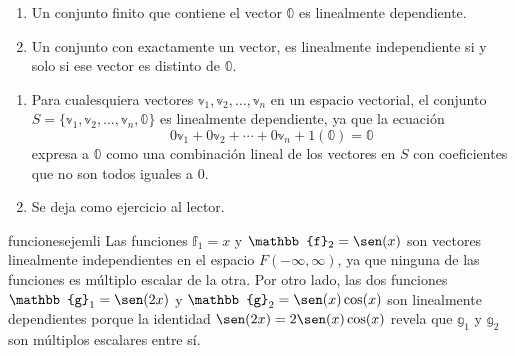 \begin{theorem}{}{}
    \begin{enumerate}[label=\roman*), topsep=6pt, itemsep=0pt]
        \item Un conjunto finito que contiene el vector $\mathbb{0}$ es linealmente dependiente.
        \item Un conjunto con exactamente un vector, es linealmente independiente si y solo si ese vector es distinto de $\mathbb{0}$.
    \end{enumerate}

    \tcblower
    \demostracion
    \begin{enumerate}[label=\roman*), topsep=6pt, itemsep=0pt]
        \item Para cualesquiera vectores $\mathbb{v}_1, \mathbb{v}_2, \dots, \mathbb{v}_n$ en un espacio vectorial, el conjunto $S = \{\mathbb{v}_1, \mathbb{v}_2, \dots, \mathbb{v}_n, \mathbb{0}\}$ es linealmente dependiente, ya que la ecuación
        $$0\mathbb{v}_1 + 0\mathbb{v}_2 + \cdots + 0\mathbb{v}_n + 1(\mathbb{0}) = \mathbb{0}$$
        expresa a $\mathbb{0}$ como una combinación lineal de los vectores en $S$ con coeficientes que no son todos iguales a $0$.
        \item Se deja como ejercicio al lector.
    \end{enumerate}
\end{theorem}

\begin{examplebox}{}{funcionesejemli}
    Las funciones $\mathbb{f}_1 = x$ y $\mathbb{f}_2 = \sen(x)$ son vectores linealmente independientes en el espacio $F(-\infty, \infty)$, ya que ninguna de las funciones es múltiplo escalar de la otra. Por otro lado, las dos funciones $\mathbb{g}_1 = \sen(2x)$ y $\mathbb{g}_2 = \sen(x) \cos(x)$ son linealmente dependientes porque la identidad $\sen (2x) = 2 \sen(x) \cos(x)$ revela que $\mathbb{g}_1$ y $\mathbb{g}_2$ son múltiplos escalares entre sí.
\end{examplebox}

\newpage

